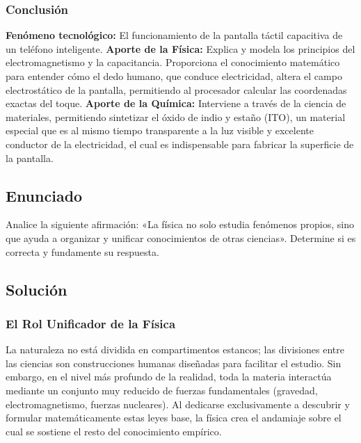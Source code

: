 \documentclass[12pt, a4paper]{article}
\begin{document}
\subsubsection*{Conclusión}
\textbf{Fenómeno tecnológico:} El funcionamiento de la pantalla táctil capacitiva de un teléfono inteligente.
\newline\newline
\textbf{Aporte de la Física:} Explica y modela los principios del electromagnetismo y la capacitancia. Proporciona el conocimiento matemático para entender cómo el dedo humano, que conduce electricidad, altera el campo electrostático de la pantalla, permitiendo al procesador calcular las coordenadas exactas del toque.
\newline\newline
\textbf{Aporte de la Química:} Interviene a través de la ciencia de materiales, permitiendo sintetizar el óxido de indio y estaño (ITO), un material especial que es al mismo tiempo transparente a la luz visible y excelente conductor de la electricidad, el cual es indispensable para fabricar la superficie de la pantalla.

\newpage

\subsection*{Enunciado}
Analice la siguiente afirmación: «La física no solo estudia fenómenos propios, sino que ayuda a organizar y unificar conocimientos de otras ciencias». Determine si es correcta y fundamente su respuesta.

\subsection*{Solución}

\subsubsection*{El Rol Unificador de la Física}
La naturaleza no está dividida en compartimentos estancos; las divisiones entre las ciencias son construcciones humanas diseñadas para facilitar el estudio. Sin embargo, en el nivel más profundo de la realidad, toda la materia interactúa mediante un conjunto muy reducido de fuerzas fundamentales (gravedad, electromagnetismo, fuerzas nucleares). Al dedicarse exclusivamente a descubrir y formular matemáticamente estas leyes base, la física crea el andamiaje sobre el cual se sostiene el resto del conocimiento empírico.
\end{document}
